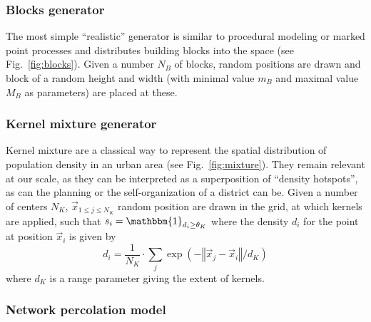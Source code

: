 \documentclass[letterpaper]{article}
\newcommand{\norm}[1]{\left\Vert #1\right\Vert}
\begin{document}



\subsubsection{Blocks generator}

The most simple ``realistic'' generator is similar to procedural modeling or marked point processes and distributes building blocks into the space (see Fig.~\ref{fig:blocks}). Given a number $N_B$ of blocks, random positions are drawn and block of a random height and width (with minimal value $m_B$ and maximal value $M_B$ as parameters) are placed at these.


\subsubsection{Kernel mixture generator}

Kernel mixture are a classical way to represent the spatial distribution of population density in an urban area \citep{anas1998urban} (see Fig.~\ref{fig:mixture}). They remain relevant at our scale, as they can be interpreted as a superposition of ``density hotspots'', as can the planning or the self-organization of a district can be. Given a number of centers $N_K$, $\vec{x}_{1\leq j \leq N_K}$ random position are drawn in the grid, at which kernels are applied, such that $s_i = \mathbbm{1}_{d_i \geq \theta_K}$ where the density $d_i$ for the point at position $\vec{x}_i$ is given by
\begin{equation}
    d_i = \frac{1}{N_K}\cdot \sum_j \exp{\left(-\norm{\vec{x}_j - \vec{x}_i}/d_K\right)} 
\end{equation}
where $d_K$ is a range parameter giving the extent of kernels.

\subsubsection{Network percolation model}
\end{document}
